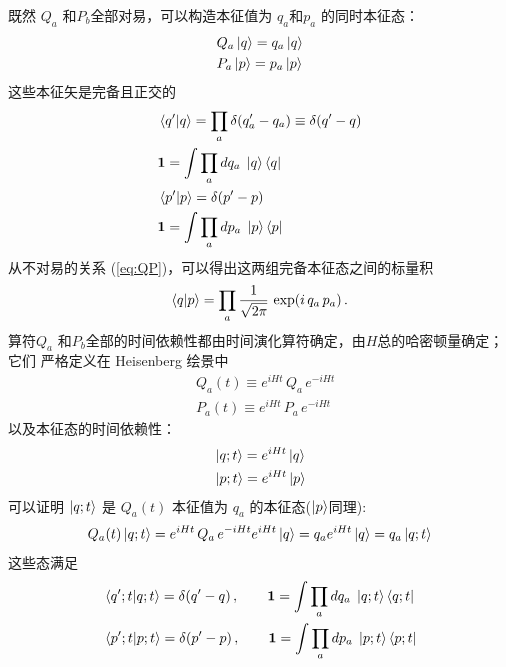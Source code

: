 既然 $Q_a$ 和$P_b$全部对易，可以构造本征值为 $q_a$和$p_a$ 的同时本征态：
\begin{subequations}
  \begin{align}
    &Q_a\ket{q} = q_a\ket{q}\\
    &P_a\ket{p} = p_a\ket{p}
  \end{align}
\end{subequations}
这些本征矢是完备且正交的
\begin{subequations}
  \begin{align}
    &\braket{q'|q} = \prod_a \delta(q'_a - q_a)
    \equiv \delta(q'-q)\\
    &\mathbf{1} = \int\prod_a dq_a\;\ket{q}\bra{q}\\
    &\braket{p'|p} = \delta(p'-p)\\
    &\mathbf{1} = \int\prod_a dp_a\;\ket{p}\bra{p}
  \end{align}
\end{subequations}
从不对易的关系 (\ref{eq:QP})，可以得出这两组完备本征态之间的标量积
\begin{equation}\label{eq:qp-inner}
  \braket{q|p} = \prod_a \frac{1}{\sqrt{2\pi}}\,
    \exp(i\,q_a\,p_a)\,.
\end{equation}
算符$Q_a$ 和$P_b$全部的时间依赖性都由时间演化算符确定，由$H$总的哈密顿量确定；它们
严格定义在 Heisenberg 绘景中
\begin{subequations}\label{eq:Heis-ops}
  \begin{align}
    &Q_a(t) \equiv e^{iHt}\,Q_a\,e^{-iHt}\\
    &P_a(t) \equiv e^{iHt}\,P_a\,e^{-iHt}
  \end{align}
\end{subequations}
以及本征态的时间依赖性：
\begin{subequations}\label{eq:Heis-states}
  \begin{align}
  &\ket{q;t} = e^{iHt}\ket{q}\\
  &\ket{p;t} = e^{iHt}\ket{p}
  \end{align}
\end{subequations}
可以证明 $\ket{q;t}$ 是 $Q_a(t)$ 本征值为 $q_a$ 的本征态($\ket{p}$同理):
\[Q_a(t)\ket{q;t}=e^{iHt}\,Q_a\,e^{-iHt}e^{iHt}\ket{q}=q_ae^{iHt}\ket{q}=q_a\ket{q;t}\]
这些态满足
\begin{subequations}
  \begin{align}
  &\braket{q';t|q;t}=\delta(q'-q)\,,\qquad
  \mathbf{1}=\int\prod_a dq_a\;\ket{q;t}\bra{q;t}\\
  &\braket{p';t|p;t}=\delta(p'-p)\,,\qquad
  \mathbf{1}=\int\prod_a dp_a\;\ket{p;t}\bra{p;t}
  \end{align}
\end{subequations}
